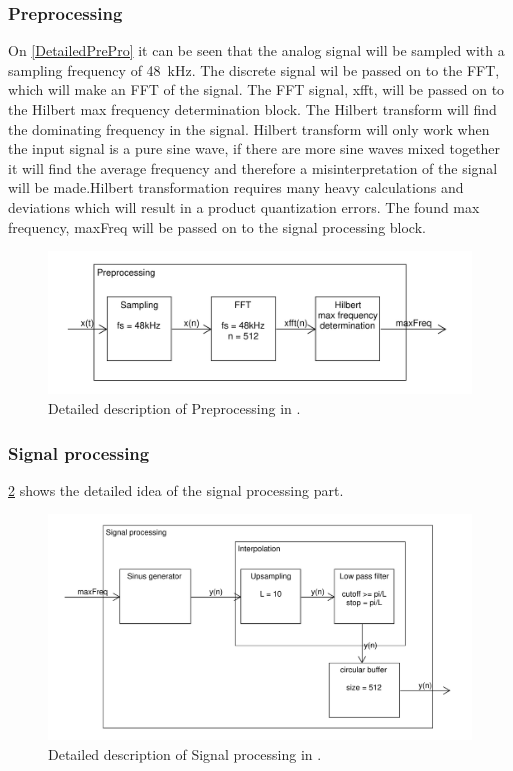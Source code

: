 \subsubsection{Preprocessing}
On \cref{DetailedPrePro} it can be seen that the analog signal will be sampled with a sampling frequency of \SI{48}{\kilo\hertz}. The discrete signal wil be passed on to the FFT, which will make an FFT of the signal. The FFT signal, xfft, will be passed on to the Hilbert max frequency determination block. The Hilbert transform will find the dominating frequency in the signal. Hilbert transform will only work when the input signal is a pure sine wave, if there are more sine waves mixed together it will find the average frequency and therefore a misinterpretation of the signal will be made.\newline Hilbert transformation requires many heavy calculations and deviations which will result in a product quantization errors. \newline The found max frequency, maxFreq will be passed on to the signal processing block.

\begin{figure}
	\centering
	\includegraphics[width=1\linewidth]{gfx/Design/DesignPrePro_IF.pdf}
	\caption{Detailed description of Preprocessing in \systemName.}
	\label{fig:DetailedPrePro}
\end{figure}
\subsubsection{Signal processing}

\cref{fig:DetailedSigPro} shows the detailed idea of the signal processing part.

\begin{figure}
	\centering
	\includegraphics[width=1\linewidth]{gfx/Design/DesignSigPro_IF.pdf}
	\caption{Detailed description of Signal processing in \systemName.}
	\label{fig:DetailedSigPro}
\end{figure}

